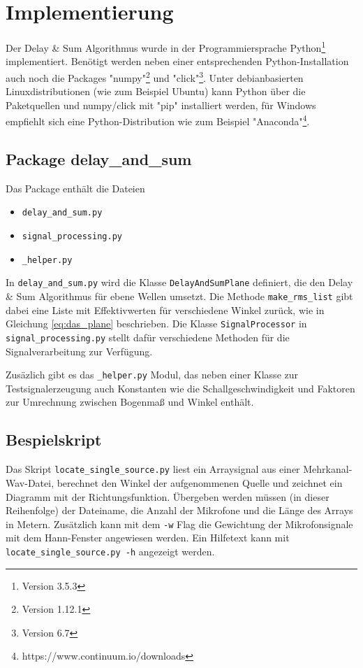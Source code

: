 \section{Implementierung}
	
	Der Delay \& Sum Algorithmus wurde in der Programmiersprache Python\footnote{Version 3.5.3} implementiert. Benötigt werden neben einer entsprechenden Python-Installation auch noch die Packages "numpy"\footnote{Version 1.12.1} und "click"\footnote{Version 6.7}. Unter debianbasierten Linuxdistributionen (wie zum Beispiel Ubuntu) kann Python über die Paketquellen und numpy/click mit "pip" installiert werden, für Windows empfiehlt sich eine Python-Distribution wie zum Beispiel "Anaconda"\footnote{https://www.continuum.io/downloads}.
	
	\subsection{Package delay\_and\_sum}
	
	Das Package enthält die Dateien
	\begin{itemize}
		\item \texttt{delay\_and\_sum.py}
		\item \texttt{signal\_processing.py}
		\item \texttt{\_helper.py}
	\end{itemize}
	In \texttt{delay\_and\_sum.py} wird die Klasse \texttt{DelayAndSumPlane} definiert, die den Delay \& Sum Algorithmus für ebene Wellen umsetzt. Die Methode \texttt{make\_rms\_list} gibt dabei eine Liste mit Effektivwerten für verschiedene Winkel zurück, wie in Gleichung \ref{eq:das_plane} beschrieben.
	Die Klasse \texttt{SignalProcessor} in \texttt{signal\_processing.py} stellt dafür verschiedene Methoden für die Signalverarbeitung zur Verfügung.
	
	Zusäzlich gibt es das \texttt{\_helper.py} Modul, das neben einer Klasse zur Testsignalerzeugung auch Konstanten wie die Schallgeschwindigkeit und Faktoren zur Umrechnung zwischen Bogenmaß und Winkel enthält.
	
\subsection{Bespielskript}

	Das Skript \texttt{locate\_single\_source.py} liest ein Arraysignal aus einer Mehrkanal-Wav-Datei, berechnet den Winkel der aufgenommenen Quelle und zeichnet ein Diagramm mit der Richtungsfunktion.
	Übergeben werden müssen (in dieser Reihenfolge) der Dateiname, die Anzahl der Mikrofone und die Länge des Arrays in Metern. Zusätzlich kann mit dem \texttt{-w} Flag die Gewichtung der Mikrofonsignale mit dem Hann-Fenster angewiesen werden.
	Ein Hilfetext kann mit \texttt{locate\_single\_source.py -h} angezeigt werden.
